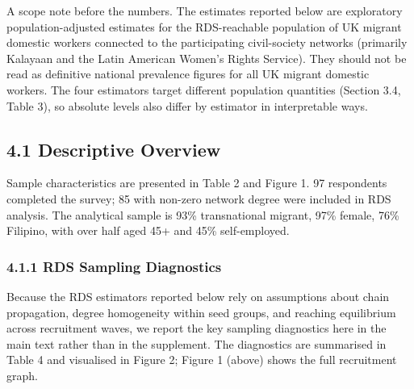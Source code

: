 \documentclass[
  12pt,
  letterpaper,
  DIV=11,
  numbers=noendperiod]{scrartcl}
\begin{document}
A scope note before the numbers. The estimates reported below are
exploratory population-adjusted estimates for the RDS-reachable
population of UK migrant domestic workers connected to the participating
civil-society networks (primarily Kalayaan and the Latin American
Women's Rights Service). They should not be read as definitive national
prevalence figures for all UK migrant domestic workers. The four
estimators target different population quantities (Section 3.4, Table
3), so absolute levels also differ by estimator in interpretable ways.

\subsection{4.1 Descriptive Overview}\label{descriptive-overview}

Sample characteristics are presented in Table 2 and Figure 1. 97
respondents completed the survey; 85 with non-zero network degree were
included in RDS analysis. The analytical sample is 93\% transnational
migrant, 97\% female, 76\% Filipino, with over half aged 45+ and 45\%
self-employed.

\subsubsection{4.1.1 RDS Sampling
Diagnostics}\label{rds-sampling-diagnostics}

Because the RDS estimators reported below rely on assumptions about
chain propagation, degree homogeneity within seed groups, and reaching
equilibrium across recruitment waves, we report the key sampling
diagnostics here in the main text rather than in the supplement. The
diagnostics are summarised in Table 4 and visualised in Figure 2; Figure
1 (above) shows the full recruitment graph.
\end{document}
